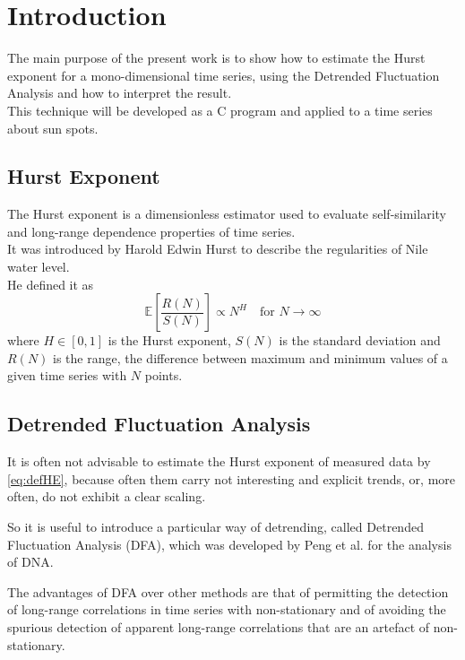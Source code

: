 \section{Introduction} 
The main purpose of the present work is to show how to estimate the Hurst exponent for a mono-dimensional time series, using the Detrended Fluctuation Analysis and how to interpret the result. \\
This technique will be developed as a C program and applied to a time series about sun spots.

\subsection{Hurst Exponent}
The Hurst exponent is a dimensionless estimator used to evaluate self-similarity and long-range dependence properties of time series. \\
It was introduced by Harold Edwin Hurst to describe the regularities of Nile water level. \\
He defined it as
\begin{equation}
\mathbb{E} \left[\frac{R(N)}{S(N)}\right] \propto N^{H} \quad \text{for } N \to \infty
\label{eq:defHE}
\end{equation}
where $H \in \left[0, 1 \right] $ is the Hurst exponent, $S (N)$ is the standard deviation and $R(N)$ is the range, the difference between maximum and minimum values of a given time series with $N$ points.

\subsection{Detrended Fluctuation Analysis}
It is often not advisable to estimate the Hurst exponent of measured data by \autoref{eq:defHE}, because often them carry not interesting and explicit trends, or, more often, do not exhibit a clear scaling.

So it is useful to introduce a particular way of detrending, called Detrended Fluctuation Analysis (DFA), which was developed by Peng et al. \cite{PhysRevE.49.1685} for the analysis of DNA.

The advantages of DFA over other methods are that of permitting the detection of long-range correlations in time series with non-stationary and of avoiding the spurious detection of apparent long-range correlations that are an artefact of non-stationary.
